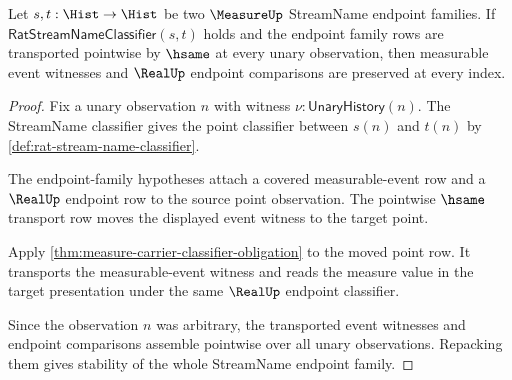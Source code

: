 \begin{theorem}
\label{thm:measure-streamname-endpoint-stability}
Let $s,t:\Hist\to\Hist$ be two $\MeasureUp$ StreamName endpoint families. If
$\mathsf{RatStreamNameClassifier}(s,t)$ holds and the endpoint family rows are
transported pointwise by $\hsame$ at every unary observation, then measurable
event witnesses and $\RealUp$ endpoint comparisons are preserved at every
index.
\end{theorem}
\begin{proof}
Fix a unary observation $n$ with witness
$\nu:\mathsf{UnaryHistory}(n)$. The StreamName classifier gives the point
classifier between $s(n)$ and $t(n)$ by
\autoref{def:rat-stream-name-classifier}.

The endpoint-family hypotheses attach a covered measurable-event row and a
$\RealUp$ endpoint row to the source point observation. The pointwise
$\hsame$ transport row moves the displayed event witness to the target point.

Apply \autoref{thm:measure-carrier-classifier-obligation} to the moved point
row. It transports the measurable-event witness and reads the measure value in
the target presentation under the same $\RealUp$ endpoint classifier.

Since the observation $n$ was arbitrary, the transported event witnesses and
endpoint comparisons assemble pointwise over all unary observations. Repacking
them gives stability of the whole StreamName endpoint family.
\end{proof}

